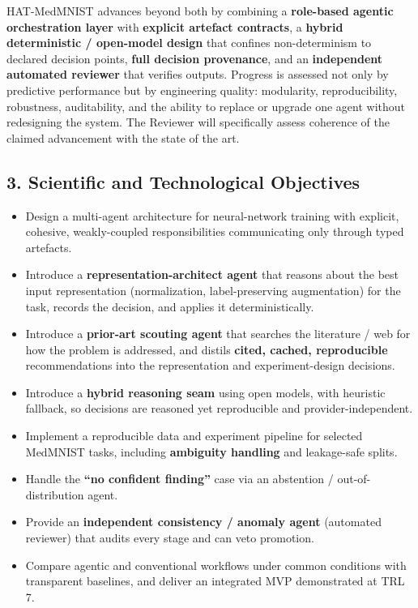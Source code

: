 \documentclass[11pt,a4paper]{article}
\begin{document}
HAT-MedMNIST advances beyond both by combining a \textbf{role-based agentic orchestration layer} with \textbf{explicit artefact contracts}, a \textbf{hybrid deterministic / open-model design} that confines non-determinism to declared decision points, \textbf{full decision provenance}, and an \textbf{independent automated reviewer} that verifies outputs. Progress is assessed not only by predictive performance but by engineering quality: modularity, reproducibility, robustness, auditability, and the ability to replace or upgrade one agent without redesigning the system. The Reviewer will specifically assess coherence of the claimed advancement with the state of the art.

\subsection*{3. Scientific and Technological Objectives}
\begin{itemize}
\item Design a multi-agent architecture for neural-network training with explicit, cohesive, weakly-coupled responsibilities communicating only through typed artefacts.
\item Introduce a \textbf{representation-architect agent} that reasons about the best input representation (normalization, label-preserving augmentation) for the task, records the decision, and applies it deterministically.
\item Introduce a \textbf{prior-art scouting agent} that searches the literature / web for how the problem is addressed, and distils \textbf{cited, cached, reproducible} recommendations into the representation and experiment-design decisions.
\item Introduce a \textbf{hybrid reasoning seam} using open models, with heuristic fallback, so decisions are reasoned yet reproducible and provider-independent.
\item Implement a reproducible data and experiment pipeline for selected MedMNIST tasks, including \textbf{ambiguity handling} and leakage-safe splits.
\item Handle the \textbf{``no confident finding''} case via an abstention / out-of-distribution agent.
\item Provide an \textbf{independent consistency / anomaly agent} (automated reviewer) that audits every stage and can veto promotion.
\item Compare agentic and conventional workflows under common conditions with transparent baselines, and deliver an integrated MVP demonstrated at TRL 7.
\end{itemize}
\end{document}
